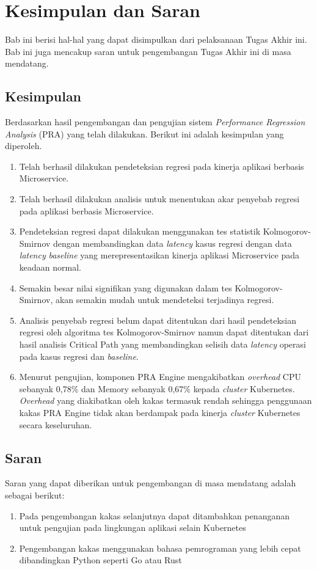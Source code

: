 \chapter{Kesimpulan dan Saran}
Bab ini berisi hal-hal yang dapat disimpulkan dari pelaksanaan Tugas Akhir ini. Bab ini juga mencakup saran untuk pengembangan Tugas Akhir ini di masa mendatang.

\section{Kesimpulan}
Berdasarkan hasil pengembangan dan pengujian sistem \textit{Performance Regression Analysis} (PRA) yang telah dilakukan. Berikut ini adalah kesimpulan yang diperoleh.
\begin{enumerate}
	\item Telah berhasil dilakukan pendeteksian regresi pada kinerja aplikasi berbasis Microservice.
	\item Telah berhasil dilakukan analisis untuk menentukan akar penyebab regresi pada aplikasi berbasis Microservice.
	\item Pendeteksian regresi dapat dilakukan menggunakan tes statistik Kolmogorov-Smirnov dengan membandingkan data \textit{latency} kasus regresi dengan data \textit{latency} \textit{baseline} yang merepresentasikan kinerja aplikasi Microservice pada keadaan normal.
	\item Semakin besar nilai signifikan yang digunakan dalam tes Kolmogorov-Smirnov, akan semakin mudah untuk mendeteksi terjadinya regresi. 
	\item Analisis penyebab regresi belum dapat ditentukan dari hasil pendeteksian regresi oleh algoritma tes Kolmogorov-Smirnov namun dapat ditentukan dari hasil analisis Critical Path yang membandingkan selisih data \textit{latency} operasi pada kasus regresi dan \textit{baseline}.
	\item Menurut pengujian, komponen PRA Engine mengakibatkan \textit{overhead} CPU sebanyak 0,78\% dan Memory sebanyak 0,67\% kepada \textit{cluster} Kubernetes. \textit{Overhead} yang diakibatkan oleh kakas termasuk rendah sehingga penggunaan kakas PRA Engine tidak akan berdampak pada kinerja \textit{cluster} Kubernetes secara keseluruhan.
\end{enumerate}

\section{Saran}
Saran yang dapat diberikan untuk pengembangan di masa mendatang adalah sebagai berikut:
\begin{enumerate}
	\item Pada pengembangan kakas selanjutnya dapat ditambahkan penanganan untuk pengujian pada lingkungan aplikasi selain Kubernetes
	\item Pengembangan kakas menggunakan bahasa pemrograman yang lebih cepat dibandingkan Python seperti Go atau Rust
\end{enumerate}